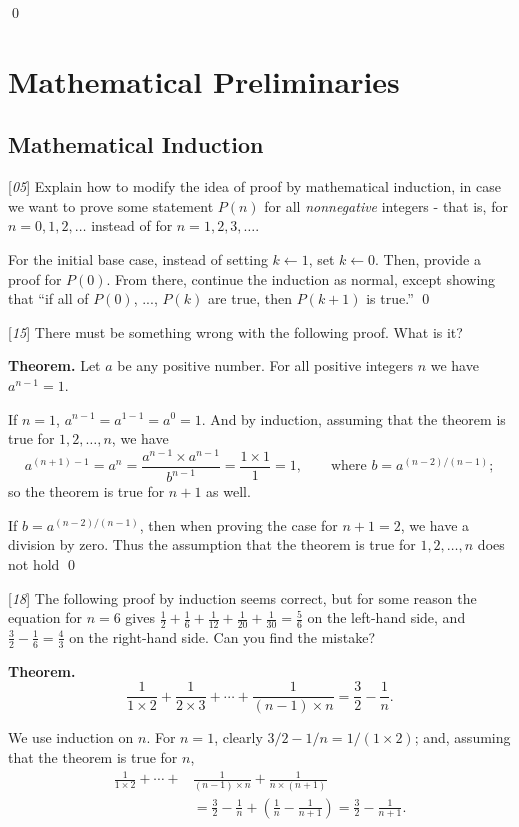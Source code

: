 \sol \qed

\section{Mathematical Preliminaries}
\subsection{Mathematical Induction}

 [\textit{05}] Explain how to modify the idea of proof by mathematical induction, in case we want to prove some statement $P(n)$ for all \textit{nonnegative} integers - that is, for $n = 0, 1, 2, \dots$ instead of for $n = 1, 2, 3, \dots$.

\sol For the initial base case, instead of setting $k \leftarrow 1$, set $k \leftarrow 0$. Then, provide a proof for $P(0)$. From there, continue the induction as normal, except showing that ``if all of $P(0)$, ..., $P(k)$ are true, then $P(k+1)$ is true.'' \qed

 [\textit{15}] There must be something wrong with the following proof. What is it?

{\bf Theorem.} Let $a$ be any positive number. For all positive integers $n$ we have $a^{n-1} = 1$.

\pf If $n = 1$, $a^{n-1} = a^{1-1} = a^{0} = 1$. And by induction, assuming that the theorem is true for $1, 2, \dots, n$, we have $$a^{(n+1) - 1} = a^n = \frac{a^{n-1} \times a^{n-1}}{b^{n-1}} = \frac{1 \times 1}{1} = 1, \qquad \text{where } b = a^{(n-2)/(n-1)};$$ so the theorem is true for $n+1$ as well.

\sol If $b = a^{(n-2)/(n-1)}$, then when proving the case for $n + 1 = 2$, we have a division by zero. Thus the assumption that the theorem is true for $1, 2, \dots, n$ does not hold \qed

 [\textit{18}] The following proof by induction seems correct, but for some reason the equation for $n=6$ gives $\frac{1}{2} + \frac{1}{6} + \frac{1}{12} + \frac{1}{20} + \frac{1}{30} = \frac{5}{6}$ on the left-hand side, and $\frac{3}{2} - \frac{1}{6} = \frac{4}{3}$ on the right-hand side. Can you find the mistake?

{\bf Theorem.} $$\frac{1}{1\times 2} + \frac{1}{2\times 3} + \cdots + \frac{1}{(n-1)\times n} = \frac{3}{2} - \frac{1}{n}.$$

\pf We use induction on $n$. For $n=1$, clearly $3/2 - 1/n = 1/(1\times 2)$; and, assuming that the theorem is true for $n$,
\begin{align*}
    \frac{1}{1\times 2} + \cdots + &\frac{1}{(n-1)\times n} + \frac{1}{n\times (n+1)} \\
    &=\frac{3}{2} - \frac{1}{n} + \left(\frac{1}{n} - \frac{1}{n+1}\right) = \frac{3}{2} - \frac{1}{n+1}.
\end{align*}


